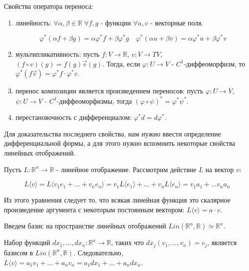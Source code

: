 \documentclass[a5paper]{article}
\theoremstyle{plain}
\theoremstyle{definition}
\numberwithin{through}{section}
\numberwithin{equation}{section}
\begin{document}
Свойства оператора переноса:
\begin{enumerate}
	\item 
	линейность: $\forall \alpha, \beta \in \mathbb{R} \; \forall f,g$ - функции $\forall u,v$ - векторные поля.	
	
	\begin{equation*}
		\varphi^{*}(\alpha f + \beta g)=\alpha\varphi^{*}f + \beta\varphi^{*}g \quad \varphi^{*}(\alpha u + \beta v) = \alpha \varphi^{*}u + \beta\varphi^{*}v
	\end{equation*}
	
	\item 
	мультипликативность: пусть $f : V \to \mathbb{R}$, $v : V \to TV$, $(f \circ v)(g)=f(g)\vec{v}(g)$. Тогда, если $\varphi : U \to V$ - $C^1$-диффеоморфизм, то $\varphi^{*}(f \vec{v})=\varphi^{*}f \cdot \varphi^{*}v$.
	
	\item перенос композиции является произведением переносов: пусть $\varphi : U \to V$, $\psi : U \to V$ - $C^1$-диффеоморфизмы, тогда $(\varphi \circ \psi)^{*}=\varphi^{*} \psi^{*}$.
	
	\item перестановочность с дифференциалом: $\varphi^{*}d=d \varphi^{*}$.
	
\end{enumerate}

Для доказательства последнего свойства, нам нужно ввести определение дифференциальной формы, а для этого нужно вспомнить некоторые свойства линейных отображений.

Пусть $L : \mathbb{R}^n \to \mathbb{R}$ - линейное отображение. Рассмотрим действие $L$ на вектор $v$:

\begin{equation*}
	L\langle v \rangle = L \langle v_1 e_1 + \ldots + v_n e_n \rangle = v_1 L\langle e_1 \rangle + \ldots + v_n L\langle e_n \rangle = v_1 a_1 + \ldots v_n a_n
\end{equation*}

Из этого уравнения следует то, что всякая линейная функция это скалярное произведение аргумента с некоторым постоянным вектором: $L \langle v \rangle = a \cdot v$.

Введем базис на пространстве линейных отображений $Lin(\mathbb{R}^n, \mathbb{R}) \simeq \mathbb{R}^n$. 

Набор функций $dx_1, \ldots, dx_n : \mathbb{R}^n \to \mathbb{R}$, таких что $dx_j(v_1, \ldots, v_n)=v_j$, является базисом в $Lin(\mathbb{R}^n, \mathbb{R})$. Следовательно, $L \langle v \rangle = a_1 v_1 + \ldots + a_n v_n = a_1 dx_1 + \ldots + a_n dx_n$.
\end{document}
